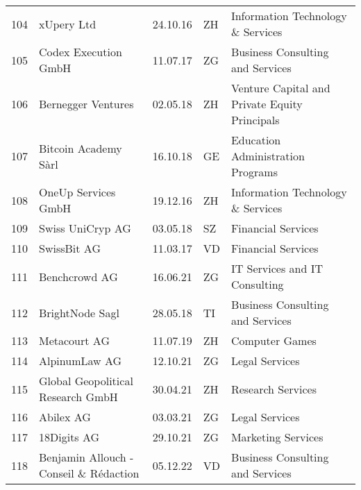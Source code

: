 \begin{tabular}{lllll}
104 &                                         xUpery Ltd &      24.10.16 &     ZH &              Information Technology \& Services \\
105 &                               Codex Execution GmbH &      11.07.17 &     ZG &               Business Consulting and Services \\
106 &                                 Bernegger Ventures &      02.05.18 &     ZH &  Venture Capital and Private Equity Principals \\
107 &                               Bitcoin Academy Sàrl &      16.10.18 &     GE &              Education Administration Programs \\
108 &                                OneUp Services GmbH &      19.12.16 &     ZH &              Information Technology \& Services \\
109 &                                   Swiss UniCryp AG &      03.05.18 &     SZ &                             Financial Services \\
110 &                                        SwissBit AG &      11.03.17 &     VD &                             Financial Services \\
111 &                                      Benchcrowd AG &      16.06.21 &     ZG &                  IT Services and IT Consulting \\
112 &                                    BrightNode Sagl &      28.05.18 &     TI &               Business Consulting and Services \\
113 &                                       Metacourt AG &      11.07.19 &     ZH &                                 Computer Games \\
114 &                                      AlpinumLaw AG &      12.10.21 &     ZG &                                 Legal Services \\
115 &                  Global Geopolitical Research GmbH &      30.04.21 &     ZH &                              Research Services \\
116 &                                          Abilex AG &      03.03.21 &     ZG &                                 Legal Services \\
117 &                                        18Digits AG &      29.10.21 &     ZG &                             Marketing Services \\
118 &             Benjamin Allouch - Conseil \& Rédaction &      05.12.22 &     VD &               Business Consulting and Services \\

\end{tabular}
